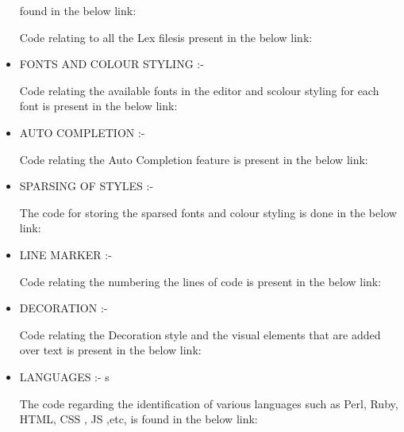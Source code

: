 \begin{itemize}
\begin{center}
found in the below link:  
\end{center}
\begin{center}
Code relating to all the Lex filesis present in the below link:  
\end{center}
\item FONTS AND COLOUR STYLING :- \newline
\begin{center}
Code relating the available fonts in the editor and scolour styling for each font is
present in the below link:  
\end{center}
\item AUTO COMPLETION :-   
\begin{center}
Code relating the Auto Completion feature is present in the below link:  
\end{center}
\item SPARSING OF STYLES :-  
\begin{center}
The code for storing the sparsed fonts and colour styling is done in the below link:  
\end{center}
\item LINE MARKER :- 
\begin{center}
Code relating the numbering the lines of code is present in the below link: 
\end{center}
\item DECORATION :-  
\begin{center}
Code relating the Decoration style and the visual elements that are added over text is
present in the below link:  
\end{center}
\item LANGUAGES :-  s
\begin{center}
The code regarding the identification of various languages such as Perl, Ruby,
HTML, CSS , JS ,etc, is found in the below link:  
\end{center}
\end{itemize}
